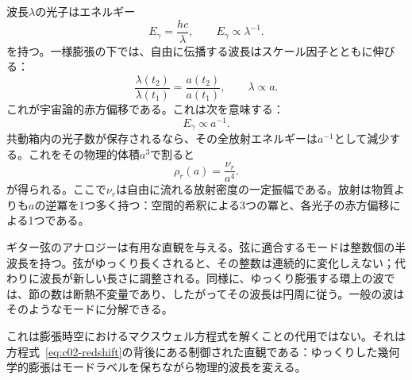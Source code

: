 波長\(\lambda\)の光子はエネルギー
\begin{equation}
E_\gamma=\frac{hc}{\lambda},
\qquad
E_\gamma\propto\lambda^{-1}.
\label{eq:c02-photon-energy}
\end{equation}
を持つ。一様膨張の下では、自由に伝播する波長はスケール因子とともに伸びる：
\begin{equation}
\frac{\lambda(t_2)}{\lambda(t_1)}
=\frac{a(t_2)}{a(t_1)},
\qquad
\lambda\propto a.
\label{eq:c02-redshift}
\end{equation}
これが宇宙論的赤方偏移である。これは次を意味する：
\begin{equation}
E_\gamma\propto a^{-1}.
\label{eq:c02-photon-redshift}
\end{equation}
共動箱内の光子数が保存されるなら、その全放射エネルギーは\(a^{-1}\)として減少する。これをその物理的体積\(a^3\)で割ると
\begin{equation}
\boxed{\rho_r(a)=\frac{\nu_r}{a^4}.}
\label{eq:c02-radiation-density}
\end{equation}
が得られる。ここで\(\nu_r\)は自由に流れる放射密度の一定振幅である。放射は物質よりも\(a\)の逆冪を1つ多く持つ：空間的希釈による3つの冪と、各光子の赤方偏移による1つである。

ギター弦のアナロジーは有用な直観を与える。弦に適合するモードは整数個の半波長を持つ。弦がゆっくり長くされると、その整数は連続的に変化しえない；代わりに波長が新しい長さに調整される。同様に、ゆっくり膨張する環上の波では、節の数は断熱不変量であり、したがってその波長は円周に従う。一般の波はそのようなモードに分解できる。

これは膨張時空におけるマクスウェル方程式を解くことの代用ではない。それは方程式~\eqref{eq:c02-redshift}の背後にある制御された直観である：ゆっくりした幾何学的膨張はモードラベルを保ちながら物理的波長を変える。

\begin{classroomqa}
\end{classroomqa}

\begin{classroomqa}
\end{classroomqa}

